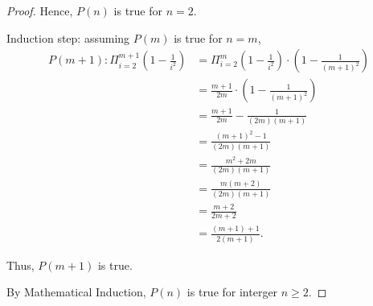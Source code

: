 \documentclass{article}
\begin{document}
\begin{enumerate}[label={(\arabic*)}]
\begin{proof}
    Hence, $P(n)$ is true for $n=2$.

    Induction step: assuming $P(m)$ is true for $n=m$,
    \begin{align}
        P(m+1): \Pi_{i=2}^{m+1}\left(1-\frac{1}{i^2}\right) & = \Pi_{i=2}^m\left(1-\frac{1}{i^2}\right) \cdot \left(1-\frac{1}{(m+1)^2}\right) \\
        & = \frac{m+1}{2m} \cdot \left(1-\frac{1}{(m+1)^2}\right) \\
        & = \frac{m+1}{2m} - \frac{1}{(2m)(m+1)} \\
        & = \frac{(m+1)^2 - 1}{(2m)(m+1)} \\
        & = \frac{m^2 + 2m}{(2m)(m+1)} \\
        & = \frac{m(m + 2)}{(2m)(m+1)} \\
        & = \frac{m+2}{2m+2} \\
        & = \frac{(m+1)+1}{2(m+1)}.
    \end{align}

    Thus, $P(m+1)$ is true.

    By Mathematical Induction, $P(n)$ is true for interger $n \ge 2$.
\end{proof}

    
\end{enumerate}
\end{document}
